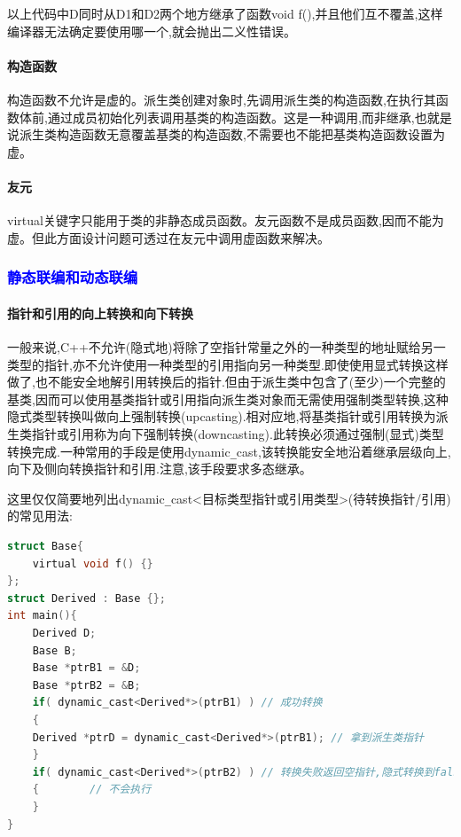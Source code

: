 \documentclass[UTF8]{ctexart}
\begin{document}
以上代码中D同时从D1和D2两个地方继承了函数void f(),并且他们互不覆盖,这样编译器无法确定要使用哪一个,就会抛出二义性错误。

\paragraph{构造函数}
构造函数不允许是虚的。派生类创建对象时,先调用派生类的构造函数,在执行其函数体前,通过成员初始化列表调用基类的构造函数。这是一种调用,而非继承,也就是说派生类构造函数无意覆盖基类的构造函数,不需要也不能把基类构造函数设置为虚。

\paragraph{友元}
virtual关键字只能用于类的非静态成员函数。友元函数不是成员函数,因而不能为虚。但此方面设计问题可透过在友元中调用虚函数来解决。

\subsubsection{\textcolor{blue}{静态联编和动态联编}}
\paragraph{指针和引用的向上转换和向下转换}
一般来说,C++不允许(隐式地)将除了空指针常量之外的一种类型的地址赋给另一类型的指针,亦不允许使用一种类型的引用指向另一种类型.即使使用显式转换这样做了,也不能安全地解引用转换后的指针.但由于派生类中包含了(至少)一个完整的基类,因而可以使用基类指针或引用指向派生类对象而无需使用强制类型转换,这种隐式类型转换叫做向上强制转换(upcasting).相对应地,将基类指针或引用转换为派生类指针或引用称为向下强制转换(downcasting).此转换必须通过强制(显式)类型转换完成.一种常用的手段是使用dynamic\verb|_|cast,该转换能安全地沿着继承层级向上,向下及侧向转换指针和引用.注意,该手段要求多态继承。

这里仅仅简要地列出dynamic\verb|_|cast<目标类型指针或引用类型>(待转换指针/引用)的常见用法:
\begin{lstlisting}[language = C,basicstyle=\small\ttfamily]
struct Base{ 
    virtual void f() {} 
};
struct Derived : Base {};
int main(){    
    Derived D;    
    Base B;   
    Base *ptrB1 = &D;   
    Base *ptrB2 = &B;
    if( dynamic_cast<Derived*>(ptrB1) ) // 成功转换    
    {        
    Derived *ptrD = dynamic_cast<Derived*>(ptrB1); // 拿到派生类指针    
    }    
    if( dynamic_cast<Derived*>(ptrB2) ) // 转换失败返回空指针,隐式转换到false    
    {        // 不会执行    
    }
}
\end{lstlisting}
\end{document}
